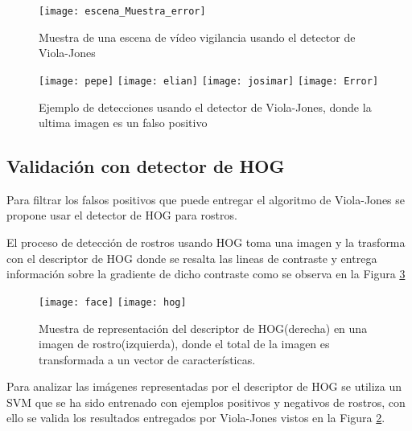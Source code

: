 \begin{figure}[h]
\center
\texttt{[image: escena\_Muestra\_error]}
\caption{Muestra de  una escena de vídeo vigilancia usando el detector de Viola-Jones}
\label{im:EscenaViola}
\end{figure}

\begin{figure}[h]
\center
\texttt{[image: pepe]}
\texttt{[image: elian]}
\texttt{[image: josimar]}
\texttt{[image: Error]}
\caption{Ejemplo de detecciones usando el detector de Viola-Jones, donde la ultima imagen es un falso positivo}
\label{im:EscenaViolaResultados}
\end{figure}

\subsection{Validación con detector de \ac{HOG}}
Para filtrar los falsos positivos que puede entregar el algoritmo de Viola-Jones se propone usar el detector de \ac{HOG} para rostros. %

El proceso de detección de rostros usando \ac{HOG} toma una imagen y la trasforma con el descriptor de \ac{HOG} donde se resalta las lineas de contraste y entrega información sobre la gradiente de dicho contraste como se observa en la Figura \ref{im:HOG}

\begin{figure}[h]
\center
\texttt{[image: face]}
\texttt{[image: hog]}
\caption{Muestra de representación del descriptor de \ac{HOG}(derecha) en una imagen de rostro(izquierda), donde el total de la imagen es transformada a un vector de características.}
\label{im:HOG}
\end{figure}



Para analizar las imágenes representadas por el descriptor de \ac{HOG} se utiliza un \ac{SVM} que se ha sido entrenado con ejemplos positivos y negativos de rostros, con ello se valida los resultados entregados por Viola-Jones vistos en la Figura \ref{im:EscenaViolaResultados}.

